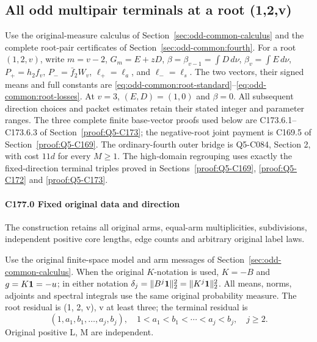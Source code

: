 \subsection{All odd multipair terminals at a root (1,2,v)}\label{proof:Q5-C177}
Use the original-measure calculus of
Section~\ref{sec:odd-common-calculus} and the complete root-pair
certificates of Section~\ref{sec:odd-common:fourth}.
For a root \((1,2,v)\), write \(m=v-2\), \(G_m=E+zD\),
\(\beta=\beta_{v-1}=\int D\,d\nu\),
\(\beta_v=\int E\,d\nu\),
\(P_+=h_2f_v\), \(P_-=\bar f_2W_v\),
\(\ell_+=\ell_a\), and \(\ell_-=\ell_s\).
The two vectors, their signed means and full constants are
\eqref{eq:odd-common:root-standard}--\eqref{eq:odd-common:root-losses}.
At \(v=3\), \((E,D)=(1,0)\) and \(\beta=0\).
All subsequent direction choices and packet estimates retain their
stated integer and parameter ranges.
The three complete finite base-vector proofs used below are C173.6.1--C173.6.3 of Section~\ref{proof:Q5-C173}; the negative-root joint payment is C169.5 of Section~\ref{proof:Q5-C169}. The ordinary-fourth outer bridge is Q5-C084, Section 2, with cost $11d$ for every $M\ge1$. The high-domain regrouping uses exactly the fixed-direction terminal triples proved in Sections~\ref{proof:Q5-C169}, \ref{proof:Q5-C172} and \ref{proof:Q5-C173}.
\paragraph{C177.0 Fixed original data and direction}

The construction retains all original arms, equal-arm multiplicities, subdivisions, independent positive core lengths, edge counts and arbitrary original label laws.

Use the original finite-space model and arm messages of
Section~\ref{sec:odd-common-calculus}.
When the original \(K\)-notation is used, \(K=-B\) and
\(g=K\mathbf1=-u\); in either notation
\(\delta_j=\|B^j\mathbf1\|_2^2=\|K^j\mathbf1\|_2^2\).
All means, norms, adjoints and spectral integrals use the same
original probability measure.
The root residual is (1, 2, v), v at least three; the terminal residual is
\[
(1,a_1,b_1,\ldots,a_j,b_j),\quad
1<a_1<b_1<\cdots<a_j<b_j,\quad j\ge2.
\]
Original positive L, M are independent.

